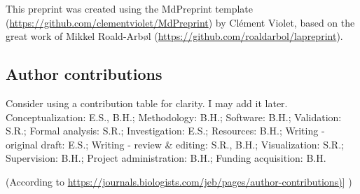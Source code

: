 \documentclass[9pt,biorxiv,doublespacing,lineno]{lapreprint}
\begin{document}
This preprint was created using the MdPreprint template
(\url{https://github.com/clementviolet/MdPreprint}) by Clément Violet,
based on the great work of Mikkel Roald-Arbøl
(\url{https://github.com/roaldarbol/lapreprint}).

\hypertarget{author-contributions}{%
\subsection{Author contributions}\label{author-contributions}}

Consider using a contribution table for clarity. I may add it later.
Conceptualization: E.S., B.H.; Methodology: B.H.; Software: B.H.;
Validation: S.R.; Formal analysis: S.R.; Investigation: E.S.; Resources:
B.H.; Writing - original draft: E.S.; Writing - review \& editing: S.R.,
B.H.; Visualization: S.R.; Supervision: B.H.; Project administration:
B.H.; Funding acquisition: B.H.

(According to
\href{https://journals.biologists.com/jeb/pages/author-contributions}{https://journals.biologists.com/jeb/pages/author-contributions)}{]}
)

\if@endfloat\clearpage\processdelayedfloats\clearpage\fi 

\printbibliography[heading=bibintoc, title={References}]


% 
\end{document}
